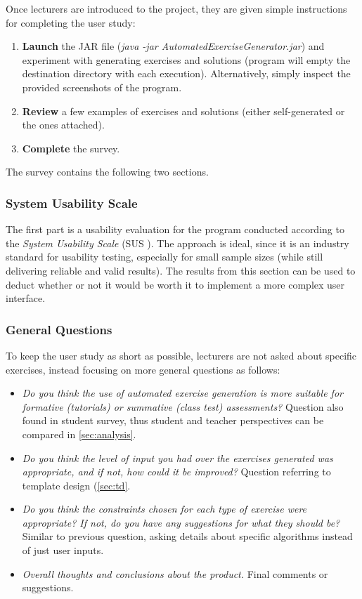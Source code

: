 \documentclass{l4proj}
\begin{document}
Once lecturers are introduced to the project, they are given simple instructions for completing the user study:
\begin{enumerate}
	\item
	\textbf{Launch} the JAR file (\emph{java -jar AutomatedExerciseGenerator.jar}) and experiment with generating exercises and solutions (program will empty the destination directory with each execution). Alternatively, simply inspect the provided screenshots of the program.
	\item
	\textbf{Review} a few examples of exercises and solutions (either self-generated or the ones attached).
	\item
	\textbf{Complete} the survey.
\end{enumerate}

The survey contains the following two sections.

\subsubsection{System Usability Scale}

The first part is a usability evaluation for the program conducted according to the \emph{System Usability Scale} (SUS \cite{a}). The approach is ideal, since it is an industry standard for usability testing, especially for small sample sizes (while still delivering reliable and valid results). The results from this section can be used to deduct whether or not it would be worth it to implement a more complex user interface.

\subsubsection{General Questions}

To keep the user study as short as possible, lecturers are not asked about specific exercises, instead focusing on more general questions as follows:

\begin{itemize}
	\item
	\emph{Do you think the use of automated exercise generation is more suitable for formative (tutorials) or summative (class test) assessments?} Question also found in student survey, thus student and teacher perspectives can be compared in \autoref{sec:analysis}. 
	\item
	\emph{Do you think the level of input you had over the exercises generated was appropriate, and if not, how could it be improved?} Question referring to template design (\autoref{sec:td}.
	\item
	\emph{Do you think the constraints chosen for each type of exercise were appropriate? If not, do you have any suggestions for what they should be?} Similar to previous question, asking details about specific algorithms instead of just user inputs.
	\item
	\emph{Overall thoughts and conclusions about the product.} Final comments or suggestions.
\end{itemize}
\end{document}
